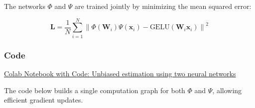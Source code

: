 \documentclass{article}
\begin{document}
The networks $\Phi$ and $\Psi$ are trained jointly by minimizing the mean squared error:

\[
\mathbf{L} = \frac{1}{N} \sum_{i=1}^N \left\| \Phi(\mathbf{W}_i) \Psi(\mathbf{x}_i) - \text{GELU}(\mathbf{W}_i \mathbf{x}_i) \right\|^2
\]

\subsubsection{Code}

\href{https://colab.research.google.com/github/v-y-l/Machine-Learning-Notebooks/blob/main/Victor's_unbiased_estimation_using_2_neural_networks.ipynb}{
Colab Notebook with Code: Unbiased estimation using two neural networks}

The code below builds a single computation graph for both $\Phi$ and $\Psi$, allowing efficient gradient updates.
\end{document}
